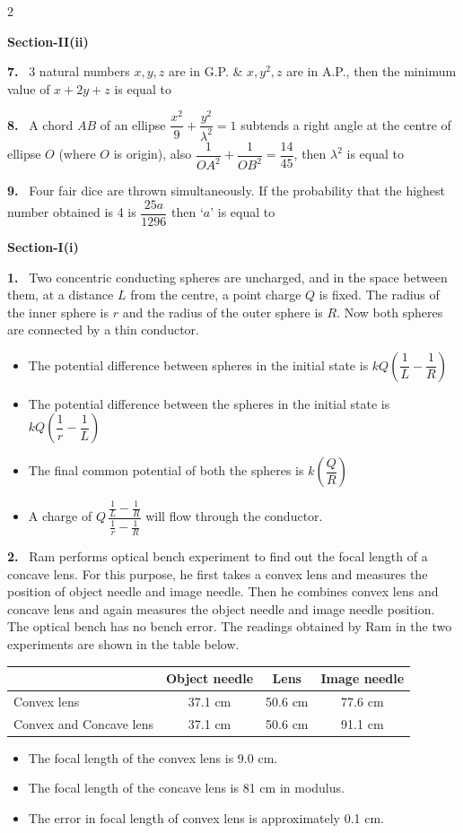 \documentclass[10pt]{extarticle}
\newcommand{\papersec}[1]{\par\bigskip{\centering\Large\bfseries PAPER-#1\par}\medskip}
\newcommand{\partsec}[2]{\par\medskip\noindent{\large\bfseries PART-#1: #2}\par\smallskip}
\newcommand{\sect}[1]{\par\smallskip\noindent\textbf{#1}\par}
\newcommand{\qn}[1]{\par\smallskip\noindent\textbf{#1.}~}
\newenvironment{qoptions}{\begin{itemize}[leftmargin=1.8em,itemsep=1pt,topsep=2pt,label={}]}{\end{itemize}}
\newcommand{\opt}[2]{\item[(#1)] #2}
\begin{document}
\begin{multicols}{2}
\sect{Section-II(ii)}
\qn{7} 3 natural numbers $x,y,z$ are in G.P. \& $x,y^2,z$ are in A.P., then the minimum value of $x+2y+z$ is equal to
\qn{8} A chord $AB$ of an ellipse $\dfrac{x^2}{9}+\dfrac{y^2}{\lambda^2}=1$ subtends a right angle at the centre of ellipse $O$ (where $O$ is origin), also $\dfrac{1}{OA^2}+\dfrac{1}{OB^2}=\dfrac{14}{45}$, then $\lambda^2$ is equal to
\qn{9} Four fair dice are thrown simultaneously. If the probability that the highest number obtained is 4 is $\dfrac{25a}{1296}$ then `$a$' is equal to
\raggedcolumns
\papersec{2}
\partsec{1}{PHYSICS}
\sect{Section-I(i)}
\qn{1} Two concentric conducting spheres are uncharged, and in the space between them, at a distance $L$ from the centre, a point charge $Q$ is fixed. The radius of the inner sphere is $r$ and the radius of the outer sphere is $R$. Now both spheres are connected by a thin conductor.
\begin{qoptions}
\opt{A}{The potential difference between spheres in the initial state is $kQ\left(\dfrac1L-\dfrac1R\right)$}
\opt{B}{The potential difference between the spheres in the initial state is $kQ\left(\dfrac1r-\dfrac1L\right)$}
\opt{C}{The final common potential of both the spheres is $k\left(\dfrac QR\right)$}
\opt{D}{A charge of $Q\,\dfrac{\frac1L-\frac1R}{\frac1r-\frac1R}$ will flow through the conductor.}
\end{qoptions}
\qn{2} Ram performs optical bench experiment to find out the focal length of a concave lens. For this purpose, he first takes a convex lens and measures the position of object needle and image needle. Then he combines convex lens and concave lens and again measures the object needle and image needle position. The optical bench has no bench error. The readings obtained by Ram in the two experiments are shown in the table below.
\begin{center}\small\setlength{\tabcolsep}{3pt}
\begin{tabular}{|p{1.9cm}|c|c|c|}\hline
 & Object needle & Lens & Image needle\\ \hline
Convex lens & 37.1 cm & 50.6 cm & 77.6 cm\\ \hline
Convex and Concave lens & 37.1 cm & 50.6 cm & 91.1 cm\\ \hline
\end{tabular}\end{center}
\begin{qoptions}
\opt{A}{The focal length of the convex lens is 9.0 cm.}
\opt{B}{The focal length of the concave lens is 81 cm in modulus.}
\opt{C}{The error in focal length of convex lens is approximately 0.1 cm.}

\end{qoptions}
\end{multicols}
\end{document}
